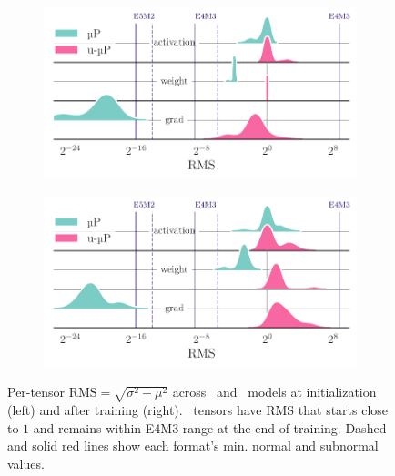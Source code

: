 
\begin{figure}[t]
    \centering
    \begin{subfigure}{.46\textwidth}
        \centering
        \includegraphics[width=\textwidth]{arXiv/figures/rms_at_init.pdf}
    \end{subfigure}
    \begin{subfigure}{.46\textwidth}
        \centering
        \includegraphics[width=\textwidth]{arXiv/figures/rms_end_training.pdf}
    \end{subfigure}
    \caption{Per-tensor $\mathrm{RMS} = \sqrt{\sigma^2 + \mu^2}$ across \umup\ and \mup\ models at initialization (left) and after training (right). \umup\ tensors have RMS that starts close to $1$ and remains within E4M3 range at the end of training. Dashed and solid red lines show each format's min. normal and subnormal values.}
    \label{fig:numerics:scale}
\end{figure}

